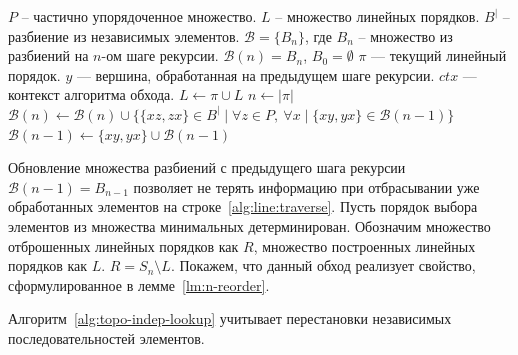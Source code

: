 \begin{algorithm}[H]
  \caption{Обход частично упорядоченного множества с учётом
  независимых последовательностей операций}
  \label{alg:topo-indep-lookup}
  \begin{algorithmic}[1]
    \Require $P$ -- частично упорядоченное множество.
    \Require $L$ -- множество линейных порядков.
    \Require $B^{|}$ -- разбиение из независимых элементов.
    \Require $\mathcal{B} = \{B_n\}$, где $B_n$ -- множество из
    разбиений на $n$-ом шаге рекурсии. $\mathcal{B}(n) = B_n$, $B_0 = \emptyset$
    \Require $\pi$ — текущий линейный порядок.
    \Require $y$ — вершина, обработанная на предыдущем шаге рекурсии.
    \Require $ctx$ — контекст алгоритма обхода.
    \State $L \gets \pi \cup L$ 
    \State \Return
    \EndIf
    \State $n \gets |\pi|$
    \State $\mathcal{B}(n) \gets \mathcal{B}(n) \cup \{\{xz,
      zx\} \in B^{|} \mid \forall z \in P,\ \forall x \mid \{xy, yx\}
    \in \mathcal{B}(n-1)\}$\label{alg:line:fillB_1}
    \label{alg:line:traverse}
    \State {} 
    \State {}
    \State $\mathcal{B}(n-1) \gets \{xy, yx\} \cup
    \mathcal{B}(n-1)$\label{alg:line:fillB_2}
    \EndIf
    \EndFor
    \EndFunction
  \end{algorithmic}
\end{algorithm}

Обновление множества разбиений с предыдущего шага рекурсии
$\mathcal{B}(n-1) = B_{n-1}$ позволяет не терять информацию
при отбрасывании уже обработанных элементов на
строке~\ref{alg:line:traverse}.
Пусть порядок выбора элементов из множества минимальных детерминирован.
Обозначим множество отброшенных линейных порядков как $R$, множество
построенных линейных порядков как $L$.
$R = S_n \setminus L$.
Покажем, что данный обход реализует
свойство, сформулированное в лемме~\ref{lm:n-reorder}.

\begin{lemma}
  Алгоритм~\ref{alg:topo-indep-lookup} учитывает перестановки
  независимых последовательностей элементов.
  \label{lm:algo}
\end{lemma}

